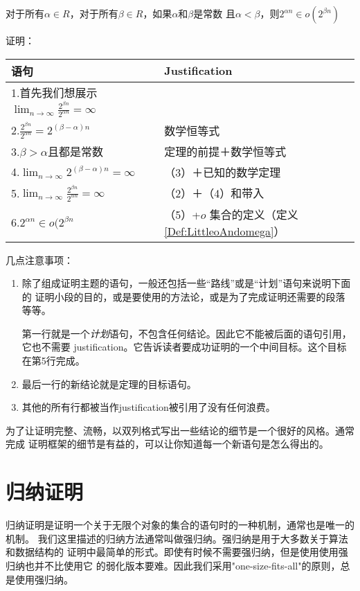 \begin{theorem}
对于所有$\alpha\in R$，对于所有$\beta\in R$，如果$\alpha$和$\beta$是常数
且$\alpha<\beta$，则$2^{\alpha n} \in o(2^{\beta n})$

\noindent 证明：

\begin{tabular}{ll}
\hline
语句  &Justification \\
\hline
1.首先我们想展示$\lim_{n\rightarrow \infty}\frac{2^{\beta n}}{2^{\alpha n}}=\infty$ & \\
2.$\frac{2^{\beta n}}{2^{\alpha n}}= 2^{(\beta-\alpha)n}$    &数学恒等式 \\
3.$\beta > \alpha$且都是常数  &定理的前提＋数学恒等式\\
4.$\lim_{n\rightarrow \infty}2^{(\beta-\alpha)n} = \infty$ &（3）＋已知的数学定理\\
5.$\lim_{n\rightarrow \infty}\frac{2^{\beta n}}{2^{\alpha n}} = \infty$ &（2）＋（4）和带入\\
6.$2^{\alpha n} \in o(2^{\beta n}$  &（5）+$o$ 集合的定义（定义\ref{Def:LittleoAndomega}）\\
\hline
\end{tabular}

\vspace{1ex}
几点注意事项：
\begin{enumerate}
\item 除了组成证明主题的语句，一般还包括一些“路线”或是“计划”语句来说明下面的
证明小段的目的，或是要使用的方法论，或是为了完成证明还需要的段落等等。

第一行就是一个\emph{计划}语句，不包含任何结论。因此它不能被后面的语句引用，它也不需要
justification。它告诉读者要成功证明的一个中间目标。这个目标在第5行完成。

\item 最后一行的新结论就是定理的目标语句。
\item 其他的所有行都被当作justification被引用了没有任何浪费。
\end{enumerate}

\end{theorem}

为了让证明完整、流畅，以双列格式写出一些结论的细节是一个很好的风格。通常完成
证明框架的细节是有益的，可以让你知道每一个新语句是怎么得出的。

\section{归纳证明}
归纳证明是证明一个关于无限个对象的集合的语句时的一种机制，通常也是唯一的机制。
我们这里描述的归纳方法通常叫做强归纳。强归纳是用于大多数关于算法和数据结构的
证明中最简单的形式。即使有时候不需要强归纳，但是使用使用强归纳也并不比使用它
的弱化版本要难。因此我们采用"one-size-fits-all"的原则，总是使用强归纳。


